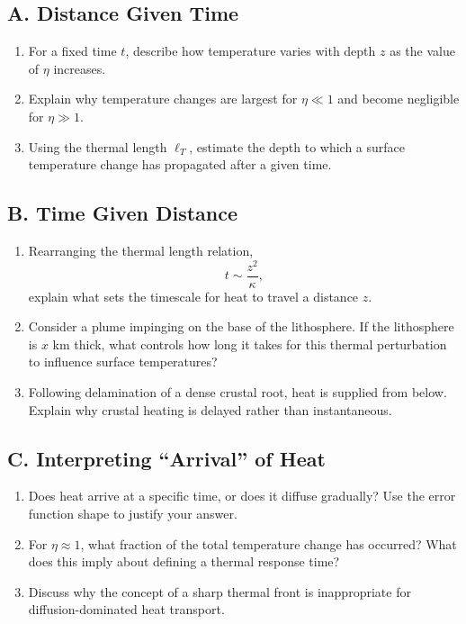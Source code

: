 \documentclass[11pt,a4paper]{article}
\begin{document}
\subsection*{A. Distance Given Time}
\begin{enumerate}
  \item For a fixed time $t$, describe how temperature varies with depth $z$ as
  the value of $\eta$ increases.

  \item Explain why temperature changes are largest for $\eta \ll 1$ and become
  negligible for $\eta \gg 1$.

  \item Using the thermal length $\ell_T$, estimate the depth to which a surface
  temperature change has propagated after a given time.
\end{enumerate}

\subsection*{B. Time Given Distance}
\begin{enumerate}
  \item Rearranging the thermal length relation,
  \[
  t \sim \frac{z^2}{\kappa},
  \]
  explain what sets the timescale for heat to travel a distance $z$.

  \item Consider a plume impinging on the base of the lithosphere.
  If the lithosphere is $x$ km thick, what controls how long it takes for this
  thermal perturbation to influence surface temperatures?

  \item Following delamination of a dense crustal root, heat is supplied from
  below. Explain why crustal heating is delayed rather than instantaneous.
\end{enumerate}

\subsection*{C. Interpreting ``Arrival'' of Heat}
\begin{enumerate}
  \item Does heat arrive at a specific time, or does it diffuse gradually?
  Use the error function shape to justify your answer.

  \item For $\eta \approx 1$, what fraction of the total temperature change has
  occurred? What does this imply about defining a thermal response time?

  \item Discuss why the concept of a sharp thermal front is inappropriate for
  diffusion-dominated heat transport.
\end{enumerate}
\end{document}
